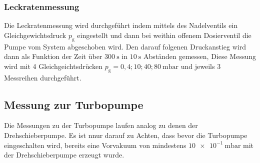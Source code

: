 		\subsubsection{Leckratenmessung}

		 	Die Leckratenmessung wird durchgeführt indem mittels des Nadelventils ein Gleichgewichtsdruck $p_\text{g}$ eingestellt und dann bei weithin offenem Dosierventil die Pumpe vom System abgeschoben wird.
			Den darauf folgenen Druckanstieg wird dann als Funktion der Zeit über $\SI{300}{\second}$ in $\SI{10}{\second}$ Abständen gemessen, 
			Diese Messung wird mit 4 Gleichgeichtsdrücken $p_\text{g} = 0,4; 10; 40; \SI{80}{\milli\bar}$ und jeweils 3 Messreihen durchgeführt.

	\subsection{Messung zur Turbopumpe}

		Die Messungen zu der Turbopumpe laufen analog zu denen der Drehschieberpumpe. 
		Es ist nnur darauf zu Achten, dass bevor die Turbopumpe eingeschalten wird, bereits eine Vorvakuum von mindestens $\SI{10e-1}{\milli\bar}$ mit der Drehschieberpumpe erzeugt wurde.


  

